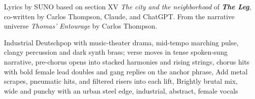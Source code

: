 
\begin{notes}
Lyrics by SUNO based on section XV \emph{The city and the neighborhood} of \emph{\bfseries The Leg}, %
co-written by Carlos Thompson, Claude, and ChatGPT. %
From the narrative universe \emph{Thomas’ Entourage} by Carlos Thompson.
\end{notes}
\begin{style}
Industrial Deutschpop with music-theater drama, mid-tempo marching pulse, clangy percussion and dark synth brass; verse moves in tense spoken-sung narrative, pre-chorus opens into stacked harmonies and rising strings, chorus hits with bold female lead doubles and gang replies on the anchor phrase, Add metal scrapes, pneumatic hits, and filtered risers into each lift, Brightly brutal mix, wide and punchy with an urban steel edge, industrial, abstract, female vocals
\end{style}
